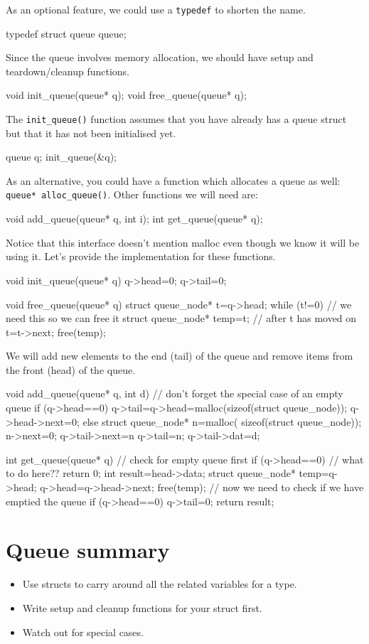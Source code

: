 As an optional feature, we could use a \texttt{typedef} to shorten the name.
\begin{codeinline}
typedef struct queue queue;
\end{codeinline}

Since the queue involves memory allocation, we should have setup and teardown/cleanup functions.
\begin{codeinline}
void init_queue(queue* q);
void free_queue(queue* q);
\end{codeinline}
The \lstinline!init_queue()! function assumes that you have already has a queue struct but that it has not been initialised yet.
\begin{codeinline}
queue q;
init_queue(&q);
\end{codeinline}

As an alternative, you could have a function which allocates a queue as well: \lstinline!queue* alloc_queue()!.
Other functions we will need are:
\begin{codeinline}
void add_queue(queue* q, int i);
int get_queue(queue* q);
\end{codeinline}

Notice that this interface doesn't mention malloc even though we know it will be using it.
Let's provide the implementation for these functions.
\begin{codeblock}
void init_queue(queue* q) {
    q->head=0;
    q->tail=0;
}

void free_queue(queue* q) {
    struct queue_node* t=q->head;
    while (t!=0) {
	    // we need this so we can free it
        struct queue_node* temp=t; // after t has moved on
        t=t->next;		
        free(temp);
    }
}
\end{codeblock}

We will add new elements to the end (tail) of the queue and remove items from the front (head) of the queue.
\begin{codeblock}
void add_queue(queue* q, int d) {
      // don't forget the special case of an empty queue
    if (q->head==0) {	
        q->tail=q->head=malloc(sizeof(struct queue_node));
        q->head->next=0;
    } else {
	struct queue_node* n=malloc(
	    sizeof(struct queue_node));
	n->next=0;
	q->tail->next=n
	q->tail=n;
    }
    q->tail->dat=d;
}

int get_queue(queue* q) {
	// check for empty queue first
    if (q->head==0) {
	  // what to do here??
	return 0;
    }
    int result=head->data;
    struct queue_node* temp=q->head;
    q->head=q->head->next;
    free(temp);
      // now we need to check if we have emptied the queue
    if (q->head==0) {
        q->tail=0;
    }
    return result;
}

\end{codeblock}









\section*{Queue summary}
\begin{itemize}
 \item Use structs to carry around all the related variables for a type.
 \item Write setup and cleanup functions for your struct first.
 \item Watch out for special cases.
\end{itemize}

